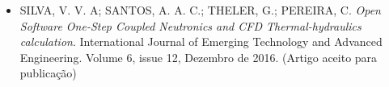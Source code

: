 \documentclass[12pt,openright,twoside,a4paper,english,french,spanish,brazil]{abntex2}
\begin{document}
\begin{anexosenv}
\begin{itemize}
\item SILVA, V. V. A; SANTOS, A. A. C.; THELER, G.; PEREIRA, C. \textit{Open Software One-Step Coupled Neutronics and CFD Thermal-hydraulics calculation}. International Journal of Emerging Technology and Advanced Engineering. Volume 6, issue 12, Dezembro de 2016. (Artigo aceito para publicação)
  


\begin{landscape}
  
\end{landscape}

%

%

%

\end{itemize}

\end{anexosenv}


\printindex
\end{document}
